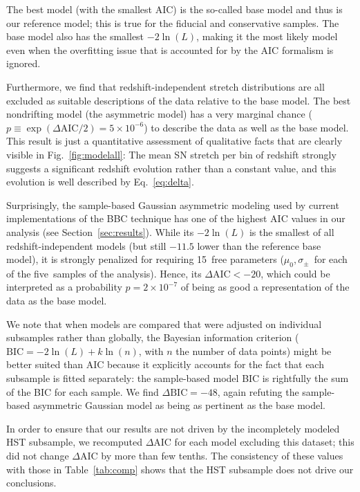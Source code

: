\documentclass[]{aa}
\begin{document}
The best model (with the smallest AIC) is the so-called base model and thus is our
reference model; this is true for the fiducial and conservative samples.
The base model also has the smallest $-2\ln(L)$, making it the most likely
model even when the overfitting issue that is accounted for by the AIC formalism is ignored.

Furthermore, we find that redshift-independent stretch distributions are all
excluded as suitable descriptions of the data relative to the base model. The best nondrifting model (the asymmetric model) has a very marginal
chance ($p \equiv \exp\left(\Delta\mathrm{AIC}/2\right) = 5\times10^{-6}$) to
describe the data as well as the base model. This result is just a quantitative
assessment of qualitative facts that are clearly visible in Fig.~\ref{fig:modelall}: The
mean SN stretch per bin of redshift strongly suggests a significant redshift
evolution rather than a constant value, and this evolution is well described by
Eq.~\ref{eq:delta}.

Surprisingly, the sample-based Gaussian asymmetric modeling used by current
implementations of the BBC technique \citep{scolnic2016, kessler2017} has one of
the highest AIC values in our analysis (see Section~\ref{sec:results}). While its
$-2\ln(L)$ is the smallest of all redshift-independent models (but still $-11.5$
lower than the reference base model), it is strongly penalized for requiring
15~free parameters ($\mu_0, \sigma_{\pm}$~for each of the five~samples of the
analysis). Hence, its $\Delta\mathrm{AIC}<-20$, which could be interpreted as a
probability $p=2\times 10^{-7}$ of being as good a representation of the data
as the base model.

We note that when models are compared that were adjusted on individual subsamples rather
than globally, the Bayesian information criterion ($\mathrm{BIC} = -2\ln(L) +
k\ln(n)$, with $n$ the number of data points) might be better suited than AIC because it explicitly accounts for the fact that each subsample is fitted
separately: the sample-based model BIC is rightfully the sum of the BIC for each
sample. We find $\Delta\mathrm{BIC}=-48$, again refuting the sample-based
asymmetric Gaussian model as being as pertinent as the base model.

In order to ensure that our results are not driven by the incompletely modeled
HST subsample, we recomputed $\Delta$AIC for each model excluding this dataset;
this did not change $\Delta$AIC by more than few tenths. The
consistency of these values with those in Table~\ref{tab:comp} shows that the HST
subsample does not drive our conclusions.
\end{document}
